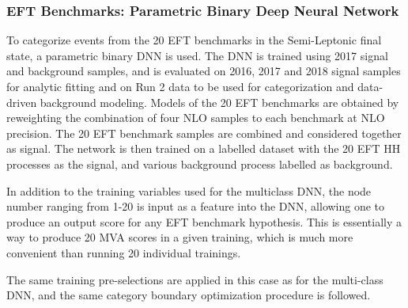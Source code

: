 \clearpage 



\subsubsection{EFT Benchmarks: Parametric Binary Deep Neural Network}

To categorize events from the 20 EFT benchmarks in the Semi-Leptonic final state, a parametric binary DNN is used. The DNN is trained using 2017 signal and background samples, and 
is evaluated on 2016, 2017 and 2018 signal samples for analytic fitting and on Run 2 data to be used for categorization and data-driven background modeling. 
Models of the 20 EFT benchmarks are obtained by reweighting the combination of four NLO samples to each benchmark at NLO precision. The 20 EFT benchmark samples are combined and considered together as signal. 
The network is then trained on a labelled dataset with the 20 EFT HH processes as the signal, 
and various background process labelled as background. 

In addition to the training variables used for the multiclass DNN, the node number ranging from 1-20 is input as a feature into the DNN, allowing one to produce an output score for 
any EFT benchmark hypothesis. This is essentially a way to produce 20 MVA scores in a given training, which is much more convenient than running 20 individual trainings.


The same training pre-selections are applied in this case as for the multi-class DNN, and the same category boundary optimization procedure is followed. 
